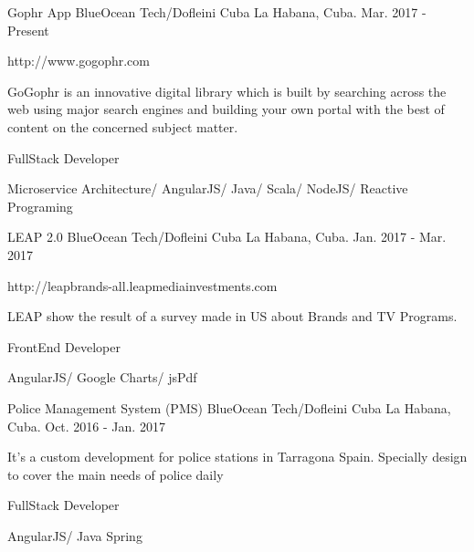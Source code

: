 


\begin{cventries}


\cventry
{Gophr App} %
{BlueOcean Tech/Dofleini Cuba} %
{La Habana, Cuba.} %
{Mar. 2017 - Present} %
{ %
\begin{cvitems}
\item {http://www.gogophr.com}
\item {GoGophr is an innovative digital library which is built by searching across the web using major search engines and building your own portal with the best of content on the concerned subject matter.}
\item {FullStack Developer}
\item {Microservice Architecture/ AngularJS/ Java/ Scala/ NodeJS/ Reactive Programing}
\end{cvitems}
}


\cventry
{LEAP 2.0} %
{BlueOcean Tech/Dofleini Cuba} %
{La Habana, Cuba.} %
{Jan. 2017 - Mar. 2017} %
{ %
\begin{cvitems}
\item {http://leapbrands-all.leapmediainvestments.com}
\item {LEAP show the result of a survey made in US about Brands and TV Programs.}
\item {FrontEnd Developer}
\item {AngularJS/ Google Charts/ jsPdf}
\end{cvitems}
}


\cventry
{Police Management System (PMS)} %
{BlueOcean Tech/Dofleini Cuba} %
{La Habana, Cuba.} %
{Oct. 2016 - Jan. 2017} %
{ %
\begin{cvitems}
\item {It’s a custom development for police stations in Tarragona Spain. Specially design to cover the main needs of police daily}
\item {FullStack Developer}
\item {AngularJS/ Java Spring}
\end{cvitems}
}


\end{cventries}
